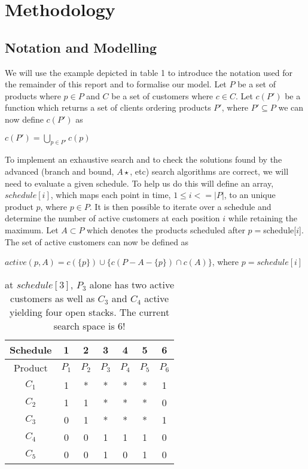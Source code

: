 \section{Methodology}
\subsection{Notation and Modelling}

We will use the example depicted in table 1 to introduce the notation used for
the remainder of this report and to formalise our model. Let $P$ be a set of
products where $p \in P$ and $C$ be a set of customers where $c \in C$. Let
$c(P')$ be a function which returns a set of clients ordering products $P'$,
where $P' \subseteq P$ we can now define $c(P')$ as

$c(P') = \bigcup_{ p\in P'} c(p)$

To implement an exhaustive search and to check the solutions found by the
advanced (branch and bound, $A\star$, etc) search algorithms are correct, we
will need to evaluate a given schedule. To help us do this will define an
array, $schedule[i]$, which maps each point in time, $1 \leq i <= |P|$,  to an
unique product $p$, where $p \in P$. It is then possible to iterate over a
schedule and determine the number of active customers at each position $i$
while retaining the maximum. Let $A \subset P$ which denotes the products
scheduled after $p = $schedule[$i$]. The set of active customers can now be
defined as

$active(p,A) = c(\{p\}) \cup \{c(P-A-\{p\}) \cap c(A) \}$, where $p = schedule[i]$

\begin{table}[H]
\begin{tabular}{|c|c|c|c|c|c|c|}\hline
Schedule & 1 & 2 & 3 & 4 & 5 & 6 \\
\hline
Product&$P_1$&$P_2$&$P_3$&$P_4$&$P_5$&$P_6$\\
\hline
$C_1$&1&*&*&*&*&1\\
$C_2$&1&1&*&*&*&0\\
$C_3$&0&1&*&*&*&1\\
$C_4$&0&0&1&1&1&0\\
$C_5$&0&0&1&0&1&0\\
\hline
\end{tabular}
\caption{at $schedule[3]$, $P_3$ alone has two active customers as well as
$C_3$ and $C_4$ active yielding four open stacks. The current search space is
$6!$}
\end{table}



